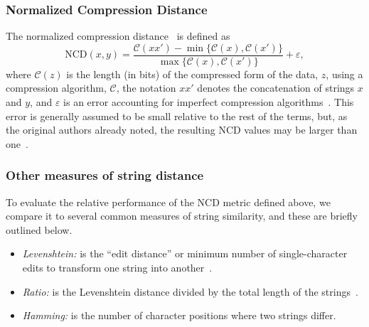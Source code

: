 \documentclass[preprint,12pt]{elsarticle}
\begin{document}
\subsubsection{Normalized Compression Distance}
\label{ncd}

The normalized compression distance~\citep[NCD;][]{ncd} is defined as
\begin{equation}
    \text{NCD}(x, y) = \frac{\mathcal{C}(xx') - \min\{\mathcal{C}(x), \mathcal{C}(x')\}}{\max\{\mathcal{C}(x), \mathcal{C}(x')\}} + \varepsilon,
\end{equation}
where $\mathcal{C}(z)$ is the length (in bits) of the compressed form of the data, $z$, using a compression algorithm, $\mathcal{C}$, the notation $xx'$ denotes the concatenation of strings $x$ and $y$, and $\varepsilon$ is an error accounting for imperfect compression algorithms~\cite{ncd}. This error is generally assumed to be small relative to the rest of the terms, but, as the original authors already noted, the resulting NCD values may be larger than one~\cite{ncd}.



\subsubsection{Other measures of string distance}
\label{string_metrics}

To evaluate the relative performance of the NCD metric defined above, we compare it to several common measures of string similarity, and these are briefly outlined below.
\begin{itemize}
    \item \textit{Levenshtein:} is the ``edit distance'' or minimum number of single-character edits to transform one string into another~\cite{navarro2001guided}.
    \item \textit{Ratio:} is the Levenshtein distance divided by the total length of the strings~\cite{levenshtein}.
    \item \textit{Hamming:} is the number of character positions where two strings differ. 
\end{itemize}

\end{document}
